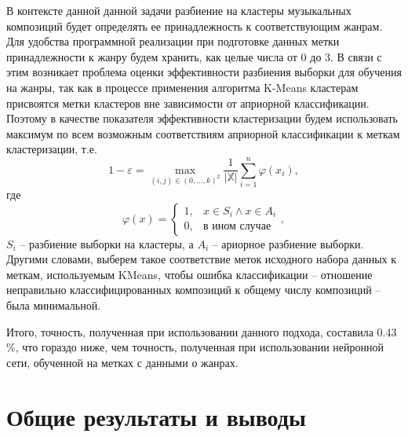 В контексте данной данной задачи разбиение на кластеры музыкальных композиций будет определять ее принадлежность к соответствующим жанрам.
Для удобства программной реализации при подготовке данных метки принадлежности к жанру
будем хранить, как целые числа от 0 до 3. В связи с этим возникает проблема оценки эффективности
разбиения выборки для обучения на жанры, так как в процессе применения алгоритма K-Means кластерам
присвоятся метки кластеров вне зависимости от априорной классификации. Поэтому в качестве показателя эффективности
кластеризации будем использовать максимум по всем возможным соответствиям априорной классификации к меткам кластеризации, т.е.
\begin{equation}
	1 - \varepsilon = \underset{(i,j) \in (0, \dots, k)^2}{\max} \frac{1}{\left|\mathbb{X}\right|}\sum_{i=1}^n \varphi(x_i),
\end{equation}
где
	$$\varphi(x) = 
	\begin{cases}
		1, &  x \in S_i \wedge x \in A_i \\
		0, & \text{в ином случае}
	\end{cases}, $$
	$S_i$ -- разбиение выборки на кластеры, а $A_i$ -- ариорное разбиение выборки.
Другими словами, выберем такое соответствие меток исходного набора данных к меткам, используемым KMeans, чтобы ошибка классификации -- отношение неправильно классифицированных композиций к общему числу композиций -- была минимальной.

Итого, точность, полученная при использовании данного подхода, составила $0.43$\%, что гораздо ниже, чем точность, полученная при использовании нейронной сети, обученной на метках с данными о жанрах.

\chapter{Общие результаты и выводы}